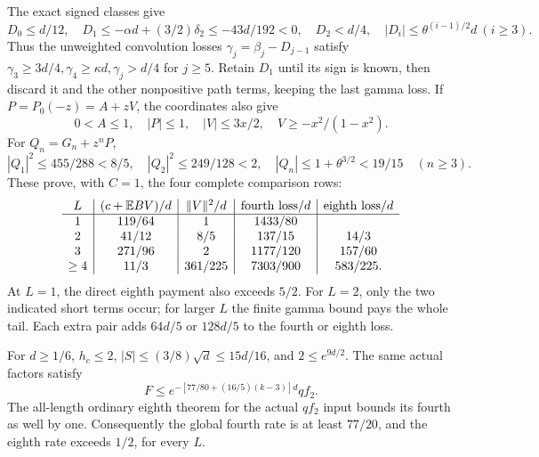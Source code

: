 The exact signed classes give
\[
 D_0\le d/12,\quad
 D_1\le-\alpha d+(3/2)\delta_2\le-43d/192<0,\quad
 D_2<d/4,\quad |D_i|\le\theta^{(i-1)/2}d\ (i\ge3).
\]
Thus the unweighted convolution losses
\(\gamma_j=\beta_j-D_{j-1}\) satisfy
\(\gamma_3\ge3d/4,\gamma_4\ge\kappa d,\gamma_j>d/4\) for \(j\ge5\).
Retain \(D_1\) until its sign is known, then discard it and the
other nonpositive path terms, keeping the last gamma loss.
If \(P=P_0(-z)=A+zV\), the coordinates also give
\[
 0<A\le1,\quad |P|\le1,\quad
 |V|\le3x/2,\quad V\ge-x^2/(1-x^2).
\]
For \(Q_n=G_n+z^nP\),
\[
 |Q_1|^2\le455/288<8/5,\quad
 |Q_2|^2\le249/128<2,\quad
 |Q_n|\le1+\theta^{3/2}<19/15\quad(n\ge3).
\]
These prove, with \(C=1\), the four complete comparison rows:
\begin{equation}\label{eq:unit-p:data-20}
\begin{array}{c|c|c|c|c}
 L&(c+\mathbb E BV)/d&\|V\|^2/d&
            \text{fourth loss}/d&\text{eighth loss}/d\\\hline
 1&119/64&1&1433/80&\\
 2&41/12&8/5&137/15&14/3\\
 3&271/96&2&1177/120&157/60\\
 \ge4&11/3&361/225&7303/900&583/225 .
\end{array}
\end{equation}
At \(L=1\), the direct eighth payment also exceeds \(5/2\).
For \(L=2\), only the two indicated short terms occur; for larger
\(L\) the finite gamma bound pays the whole tail.
Each extra pair adds \(64d/5\) or \(128d/5\) to the fourth or
eighth loss. 

For \(d\ge1/6\), \(h_c\le2\), \(|S|\le(3/8)\sqrt d\le15d/16\),
and \(2\le e^{9d/2}\). The same actual factors satisfy
\[
 F\le e^{-[77/80+(16/5)(k-3)]d}qf_2 .
\]
The all-length ordinary eighth theorem for the actual \(qf_2\)
input bounds its fourth as well by one.
Consequently the global fourth rate is at least \(77/20\),
and the eighth rate exceeds \(1/2\), for every \(L\).

